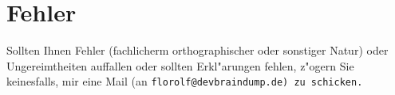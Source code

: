 \section{Fehler}
Sollten Ihnen Fehler (fachlicherm orthographischer oder sonstiger Natur) oder Ungereimtheiten auffallen oder sollten
Erkl"arungen fehlen, z"ogern Sie keinesfalls, mir eine Mail (an \tt{florolf@devbraindump.de}\rm{}) zu schicken.
